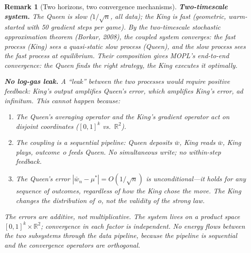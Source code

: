 \documentclass[11pt,a4paper]{article}
\newtheorem{remark}[theorem]{Remark}
\newcommand{\R}{\mathbb{R}}
\begin{document}
\begin{remark}[Two horizons, two convergence mechanisms]
\medskip\noindent
\textbf{Two-timescale system.}\;
The Queen is slow ($1/\sqrt{n}$, all data);
the King is fast (geometric, warm-started with 50 gradient
steps per game).
By the two-timescale stochastic approximation theorem
\textup{(Borkar, 2008)}, the coupled system converges:
the fast process (King) sees a quasi-static slow process
(Queen), and the slow process sees the fast process at
equilibrium.
Their composition gives MOPL's end-to-end convergence:
the Queen finds the right strategy,
the King executes it optimally.

\medskip\noindent
\textbf{No log-gas leak.}\;
A ``leak'' between the two processes would require
positive feedback: King's output amplifies Queen's
error, which amplifies King's error, ad infinitum.
This cannot happen because:
\begin{enumerate}[label=\textup{(\alph*)},nosep]
\item The Queen's averaging operator and the King's
  gradient operator act on \emph{disjoint coordinates}
  ($[0,1]^k$ vs.\ $\R^2$).
\item The coupling is a \emph{sequential pipeline}:
  Queen deposits $\bar{w}$, King reads $\bar{w}$,
  King plays, outcome~$o$ feeds Queen.
  No simultaneous write; no within-step feedback.
\item The Queen's error $|\bar{w}_n - \mu^*| = O(1/\sqrt{n})$
  is \emph{unconditional}---it holds for any sequence of
  outcomes, regardless of how the King chose the move.
  The King changes the \emph{distribution} of~$o$, not the
  \emph{validity} of the strong law.
\end{enumerate}
The errors are additive, not multiplicative.
The system lives on a product space
$[0,1]^k \times \R^2$;
convergence in each factor is independent.
No energy flows between the two subsystems through the
data pipeline, because the pipeline is sequential and
the convergence operators are orthogonal.
\end{remark}
\end{document}
